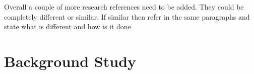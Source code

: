 \documentclass[a4paper, 11pt]{article}
\begin{document}
\color{red}
Overall a couple of more research references need to be added. They could be completely different or similar. If similar then refer in the same paragraphs and state what is different and how is it done
\color{black}







  





\section{Background Study}
\color{red}
\end{document}
